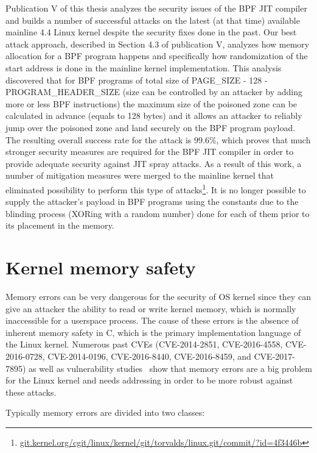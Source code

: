 Publication V of this thesis analyzes the security issues of the BPF JIT compiler and builds a number of successful attacks on the latest (at that time) available mainline 4.4 Linux kernel despite the security fixes done in the past. 
Our best attack approach, described in Section 4.3 of publication V, analyzes how memory allocation for a BPF program happens and specifically how randomization of the start address is done in the mainline kernel implementation. 
This analysis discovered that for BPF programs of total size of PAGE\_SIZE - 128 - PROGRAM\_HEADER\_SIZE (size can be controlled by an attacker by adding more or less BPF instructions) the maximum size of the poisoned zone can be calculated in advance (equals to 128 bytes) and it allows an attacker to reliably jump over the poisoned zone and land securely on the BPF program payload. The resulting overall success rate for the attack is 99.6\%, which proves that much stronger security measures are required for the BPF JIT compiler in order to provide adequate security against JIT spray attacks. As a result of this work, a number of mitigation measures were merged to the mainline kernel that eliminated possibility to perform this type of attacks\footnote{\url{git.kernel.org/cgit/linux/kernel/git/torvalds/linux.git/commit/?id=4f3446b}}. It is no longer possible to supply the attacker's payload in BPF programs using the constants due to the blinding process (XORing with a random number) done for each of them prior to its placement in the memory.

\section{Kernel memory safety}
\label{sec:kern-mem-safety}

Memory errors can be very dangerous for the security of OS kernel since they can give an attacker the ability to read or write kernel memory, which is normally inaccessible for a userspace process. The cause of these errors is the absence of inherent memory safety in C, which is the primary implementation language of the Linux kernel. 
Numerous past CVEs (CVE-2014-2851, CVE-2016-4558, CVE-2016-0728, CVE-2014-0196, CVE-2016-8440, CVE-2016-8459, and CVE-2017-7895) as well as vulnerability studies~\cite{raheja2016analysis, chen2011linux} show that memory errors are a big problem for the Linux kernel and needs addressing in order to be more robust against these attacks.

Typically memory errors are divided into two classes:

